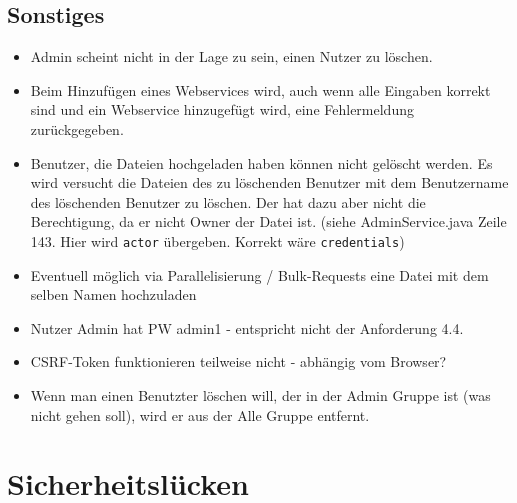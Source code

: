 \documentclass[12pt,DIV14,BCOR10mm,a4paper,parskip=half-,headsepline,headinclude,english,ngerman,bibliography=totocnumbered]{scrreprt}
\begin{document}
\section{Sonstiges}

\begin{itemize} 
  
  \item Admin scheint nicht in der Lage zu sein, einen Nutzer zu löschen.
  \item Beim Hinzufügen eines Webservices wird, auch wenn alle Eingaben korrekt sind und ein Webservice hinzugefügt wird, eine Fehlermeldung zurückgegeben.
  
  \item Benutzer, die Dateien hochgeladen haben können nicht gelöscht werden. Es wird versucht die Dateien des zu löschenden Benutzer mit dem Benutzername des löschenden Benutzer zu löschen. Der hat dazu aber nicht die Berechtigung, da er nicht Owner der Datei ist. (siehe AdminService.java Zeile 143. Hier wird \texttt{actor} übergeben. Korrekt wäre \texttt{credentials})
  \item Eventuell möglich via Parallelisierung / Bulk-Requests eine Datei mit dem selben Namen hochzuladen
  \item Nutzer Admin hat PW admin1 - entspricht nicht der Anforderung 4.4.
  \item CSRF-Token funktionieren teilweise nicht - abhängig vom Browser?
  \item Wenn man einen Benutzter löschen will, der in der Admin Gruppe ist (was nicht gehen soll), wird er aus der Alle Gruppe entfernt.
\end{itemize}

\chapter{Sicherheitslücken}
\end{document}

